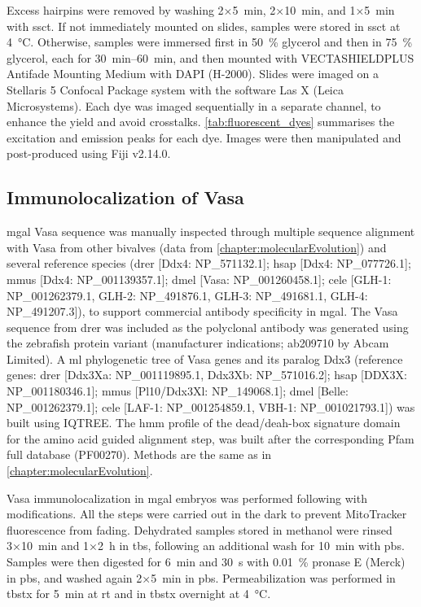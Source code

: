Excess hairpins were removed by washing 2×\qty{5}{\minute}, 2×\qty{10}{\minute}, and 1×\qty{5}{\minute} with \gls{ssct}. If not immediately mounted on slides, samples were stored in \gls{ssct} at \qty{+4}{\degreeCelsius}. Otherwise, samples were immersed first in \qty{50}{\percent} glycerol and then in \qty{75}{\percent} glycerol, each for \qtyrange{30}{60}{\minute}, and then mounted with VECTASHIELD\textregistered PLUS Antifade Mounting Medium with DAPI (H-2000). Slides were imaged on a Stellaris 5 Confocal Package system with the software Las X (Leica Microsystems). Each dye was imaged sequentially in a separate channel, to enhance the yield and avoid crosstalks. \cref{tab:fluorescent_dyes} summarises the excitation and emission peaks for each dye. Images were then manipulated and post-produced using Fiji v2.14.0.

\subsection{Immunolocalization of Vasa}
\gls{mgal} Vasa sequence was manually inspected through multiple sequence alignment with Vasa from other bivalves (data from \cref{chapter:molecularEvolution}) and several reference species (\gls{drer} [Ddx4: NP\_571132.1]; \gls{hsap} [Ddx4: NP\_077726.1]; \gls{mmus} [Ddx4: NP\_001139357.1]; \gls{dmel} [Vasa: NP\_001260458.1]; \gls{cele} [GLH-1: NP\_001262379.1, GLH-2: NP\_491876.1, GLH-3: NP\_491681.1, GLH-4: NP\_491207.3]), to support commercial antibody specificity in \gls{mgal}. The Vasa sequence from \gls{drer} was included as the polyclonal antibody was generated using the zebrafish protein variant (manufacturer indications; ab209710 by Abcam Limited). A \gls{ml} phylogenetic tree of Vasa genes and its paralog Ddx3 (reference genes:  \gls{drer} [Ddx3Xa: NP\_001119895.1, Ddx3Xb: NP\_571016.2]; \gls{hsap} [DDX3X: NP\_001180346.1]; \gls{mmus} [Pl10/Ddx3Xl: NP\_149068.1]; \gls{dmel} [Belle: NP\_001262379.1]; \gls{cele} [LAF-1: NP\_001254859.1, VBH-1: NP\_001021793.1]) was built using IQTREE. The \gls{hmm} profile of the \gls{dead/deah-box} signature domain for the amino acid guided alignment step, was built after the corresponding Pfam full database (PF00270). Methods are the same as in \cref{chapter:molecularEvolution}.

Vasa immunolocalization in \gls{mgal} embryos was performed following  with modifications. All the steps were carried out in the dark to prevent MitoTracker fluorescence from fading. Dehydrated samples stored in methanol were rinsed 3×\qty{10}{\minute} and 1×\qty{2}{\hour} in \gls{tbs}, following an additional wash for \qty{10}{\minute} with \gls{pbs}. Samples were then digested for \qty{6}{\minute} and \qty{30}{\second} with \qty{0.01}{\percent} pronase E (Merck) in \gls{pbs}, and washed again 2×\qty{5}{\minute} in \gls{pbs}. Permeabilization was performed in \gls{tbstx} \zeroonepercent{} for \qty{5}{\minute} at \gls{rt} and in \gls{tbstx} \onepercent{} overnight at \qty{4}{\degreeCelsius}.

